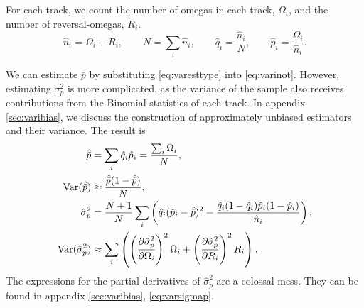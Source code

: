 \documentclass[12pt]{article}
\newcommand{\pdiffc}[3][\rule{0mm}{0mm}]{\left (\frac{\partial #2}{\partial {#3}}\right )_{\!\!#1}}
\DeclareMathOperator{\var}{Var}
\newcommand{\prn}[1]{\left ( #1 \right )}
\begin{document}
For each track, we count the number of omegas in each track, $\Omega_i$, and the number of reversal-omegas, $R_i$.
%
\begin{equation}\label{eq:varesttype}
  \hat{n}_i = \Omega_i+R_i, \qquad
  N = \sum_i \hat{n}_i, \qquad
  \hat{q}_i = \frac{\hat{n}_i}{N}, \qquad
  \hat{p}_i = \frac{\Omega_i}{\hat{n}_i}.
\end{equation}
%


We can estimate $\bar{p}$ by substituting \eqref{eq:varesttype} into \eqref{eq:varinot}. However, estimating $\sigma_p^2$ is more complicated, as the variance of the sample also receives contributions from the Binomial statistics of each track. In appendix \ref{sec:varibias}, we discuss the construction of approximately unbiased estimators and their variance. The result is
%
\begin{equation}\label{eq:variests}
  \begin{aligned}
    \hat{\bar{p}} &= \sum_i \hat{q}_i \hat{p}_i
        = \frac{\sum_i \Omega_i}{N},\\
    \var(\hat{\bar{p}}) &\approx \frac{\hat{\bar{p}}(1-\hat{\bar{p}})}{N},\\
    \hat{\sigma}_p^2 &= \frac{N+1}{N} \sum_i\prn{ \hat{q}_i(\hat{p}_i-\hat{\bar{p}})^2 - \frac{\hat{q}_i(1-\hat{q}_i)\hat{p}_i(1-\hat{p}_i)}{\hat{n}_i}},\\
    \var(\hat{\sigma}_p^2) &\approx \sum_i\prn{ \pdiffc{\hat{\sigma}_p^2}{\Omega_i}^2 \Omega_i + \pdiffc{\hat{\sigma}_p^2}{R_i}^2 R_i }.
  \end{aligned}
\end{equation}
%
The expressions for the partial derivatives of $\hat{\sigma}_p^2$ are a colossal mess. They can be found in appendix \ref{sec:varibias}, \eqref{eq:varsigmap}.
\end{document}
